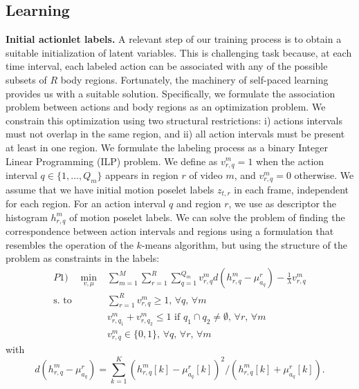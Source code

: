 \subsection{Learning} \label{subsec:learning}

\textbf{Initial actionlet labels.} A relevant step of our training process is to obtain a suitable initialization 
of latent variables. This is challenging task because, at each time 
interval, each labeled action can be associated with any of the possible 
subsets of $R$ body regions. Fortunately, the machinery of self-paced 
learning \cite{Kumar:EtAl:2010} provides us with a suitable solution. Specifically, we 
formulate the association problem between actions and body regions as an 
optimization problem. We constrain this optimization using two structural 
restrictions: i) actions intervals must not overlap in the same region, and 
ii) all action 
intervals must be present at least in one region. We formulate the labeling 
process as a binary Integer Linear Programming (ILP) problem. We define as 
$v_{r,q}^m=1$ when the action interval $q \in \{1,\dots,Q_m\}$ appears in 
region 
$r$ of video $m$, and $v_{r,q}^m=0$ otherwise. We assume that we have initial 
motion poselet 
labels 
$z_{t,r}$ in each frame, independent for each region. For an action interval $q$ and region $r$, we use as 
descriptor the histogram $h_{r,q}^m$ of motion poselet labels. We can solve the problem of finding 
the correspondence between action intervals and regions using a formulation 
that resembles the operation of the $k$-means algorithm, but using the 
structure of the problem as constraints in the labels:
{\small
\begin{equation}
\begin{split}
P1) \quad \min_{v,\mu} &\sum_{m=1}^M  \sum_{r=1}^R \sum_{q=1}^{Q_m}  v_{r,q}^m 
d( h_{r,q}^m - \mu_{a_q}^r) -\frac{1}{\lambda} v_{r,q}^m\\ 
 \text{s. to} 
\quad 
& \sum_{r=1}^R v_{r,q}^m \ge 1\text{, }\forall q\text{, }\forall m \\ 
& v_{r,q_1}^m + v_{r,q_2}^m \le 1 \text{ if } q_1\cap q_2 \neq \emptyset 
\text{, 
}\forall r\text{, }\forall m\\  
& v_{r,q}^m \in \{0,1\}\text{, }\forall q\text{, }\forall{r}\text{, }\forall m
\end{split}
\end{equation}
with
\begin{equation}
d( h_{r,q}^m - \mu_{a_q}^r) = \sum_{k=1}^K (h_{r,q}^m[k] - 
\mu_{a_q}^r[k])^2/(h_{r,q}^m[k] +\mu_{a_q}^r[k]).
\end{equation}}

